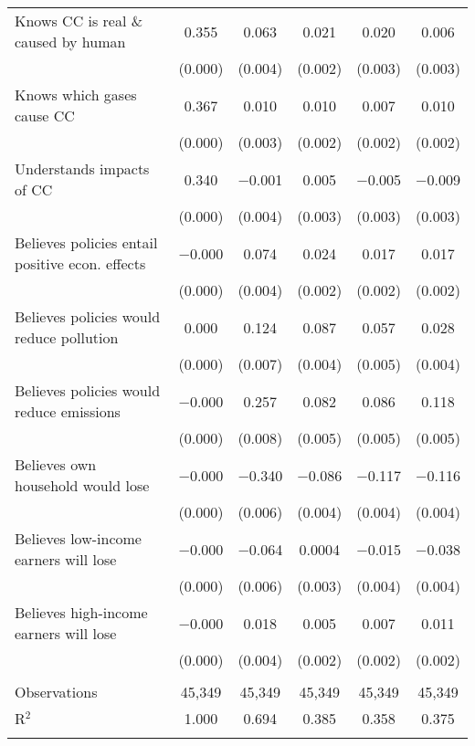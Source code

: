 \begin{tabular}{@{\extracolsep{5pt}}lccccc}
  Knows CC is real \& caused by human & 0.355 & 0.063 & 0.021 & 0.020 & 0.006 \\ 
  & (0.000) & (0.004) & (0.002) & (0.003) & (0.003) \\ 
  Knows which gases cause CC & 0.367 & 0.010 & 0.010 & 0.007 & 0.010 \\ 
  & (0.000) & (0.003) & (0.002) & (0.002) & (0.002) \\ 
  Understands impacts of CC & 0.340 & $-$0.001 & 0.005 & $-$0.005 & $-$0.009 \\ 
  & (0.000) & (0.004) & (0.003) & (0.003) & (0.003) \\ 
  Believes policies entail positive econ. effects & $-$0.000 & 0.074 & 0.024 & 0.017 & 0.017 \\ 
  & (0.000) & (0.004) & (0.002) & (0.002) & (0.002) \\ 
  Believes policies would reduce pollution & 0.000 & 0.124 & 0.087 & 0.057 & 0.028 \\ 
  & (0.000) & (0.007) & (0.004) & (0.005) & (0.004) \\ 
  Believes policies would reduce emissions & $-$0.000 & 0.257 & 0.082 & 0.086 & 0.118 \\ 
  & (0.000) & (0.008) & (0.005) & (0.005) & (0.005) \\ 
  Believes own household would lose & $-$0.000 & $-$0.340 & $-$0.086 & $-$0.117 & $-$0.116 \\ 
  & (0.000) & (0.006) & (0.004) & (0.004) & (0.004) \\ 
  Believes low-income earners will lose & $-$0.000 & $-$0.064 & 0.0004 & $-$0.015 & $-$0.038 \\ 
  & (0.000) & (0.006) & (0.003) & (0.004) & (0.004) \\ 
  Believes high-income earners will lose & $-$0.000 & 0.018 & 0.005 & 0.007 & 0.011 \\ 
  & (0.000) & (0.004) & (0.002) & (0.002) & (0.002) \\ 
 \hline \\[-1.8ex] 

Observations & 45,349 & 45,349 & 45,349 & 45,349 & 45,349 \\ 
R$^{2}$ & 1.000 & 0.694 & 0.385 & 0.358 & 0.375 \\ 
\hline 
\hline \\[-1.8ex] 
\end{tabular} 